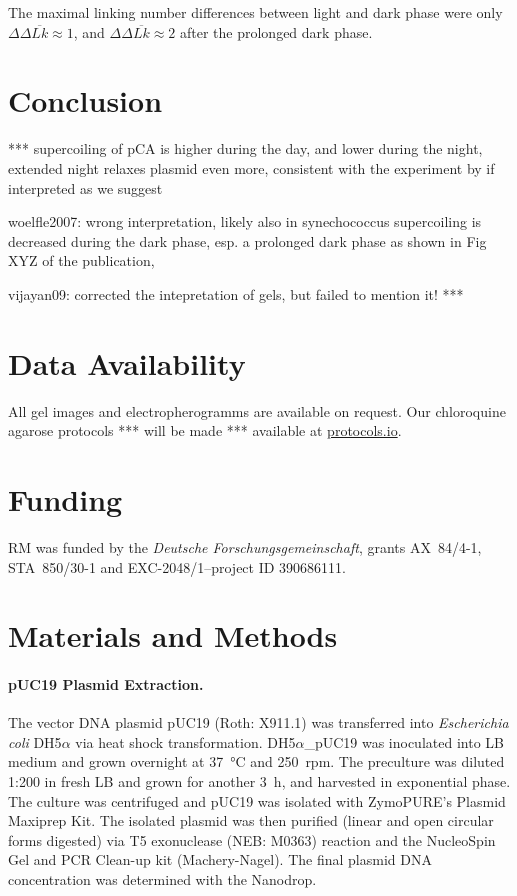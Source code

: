 \documentclass[10pt,a4]{article}
\newcommand{\TODO}[1]{\begingroup\color{red}*** #1 ***\endgroup}
\begin{document}
The maximal linking number differences between light and dark phase
were only $\Delta \Delta \overline{Lk} \approx 1$, and $\Delta \Delta
\overline{Lk} \approx 2$ after the prolonged dark phase.


\section{Conclusion}

\TODO{
supercoiling of pCA is higher during the day, and lower during the
night, extended night relaxes plasmid even more, consistent
with the experiment by \cite{Woelfle2007} if interpreted
as we suggest

woelfle2007: wrong interpretation, likely also in synechococcus
supercoiling is decreased during the dark phase, esp. a prolonged
dark phase as shown in Fig XYZ of the publication,


vijayan09: corrected the intepretation of gels, but failed to mention
it!
}

\section*{Data Availability}
All gel images and electropherogramms are available on request. Our
chloroquine agarose protocols \TODO{will be made} available at
\url{protocols.io}.

\section*{Funding}
RM was funded by the \textit{Deutsche Forschungsgemeinschaft}, grants
AX~84/4-1, STA~850/30-1 and EXC-2048/1--project ID 390686111. 


\section{Materials and Methods}

\paragraph{pUC19 Plasmid Extraction.}
The vector DNA plasmid pUC19 (Roth: X911.1) was transferred into
\textit{Escherichia coli} DH5$\alpha$ via heat shock
transformation. DH5$\alpha$\_pUC19 was inoculated into LB medium and
grown overnight at \SI{37}{\celsius} and \SI{250}{rpm}. The preculture
was diluted 1:200 in fresh LB and grown for another \SI{3}{\hour}, and
harvested in exponential phase. The culture was centrifuged and pUC19
was isolated with ZymoPURE's Plasmid Maxiprep Kit. The isolated
plasmid was then purified (linear and open circular forms digested)
via T5 exonuclease (NEB: M0363) reaction and the NucleoSpin Gel and
PCR Clean-up kit (Machery-Nagel). The final plasmid DNA
concentration was determined with the Nanodrop.
%
\end{document}
